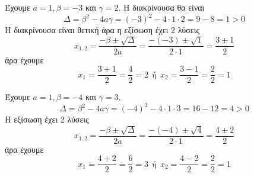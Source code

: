 \begin{alist}
\item Έχουμε $ a=1,\beta=-3 $ και $ \gamma=2 $. Η διακρίνουσα θα είναι
\[ \Delta=\beta^2-4a\gamma=(-3)^2-4\cdot 1\cdot 2=9-8=1>0 \]
Η διακρίνουσα είναι θετική άρα η εξίσωση έχει 2 λύσεις
\[ x_{1,2}=\frac{-\beta\pm\sqrt{\Delta}}{2a}=\frac{-(-3)\pm\sqrt{1}}{2\cdot 1}=\frac{3\pm 1}{2} \]
άρα έχουμε
\[ x_1=\frac{3+1}{2}=\frac{4}{2}=2\ \ \text{ή}\ \ x_2=\frac{3-1}{2}=\frac{2}{2}=1 \]
\item Έχουμε $ a=1,\beta=-4 $ και $ \gamma=3 $.
\[ \Delta=\beta^2-4a\gamma=(-4)^2-4\cdot 1\cdot 3=16-12=4>0 \]
Η εξίσωση έχει 2 λύσεις
\[ x_{1,2}=\frac{-\beta\pm\sqrt{\Delta}}{2a}=\frac{-(-4)\pm\sqrt{4}}{2\cdot 1}=\frac{4\pm 2}{2} \]
άρα έχουμε
\[ x_1=\frac{4+2}{2}=\frac{6}{2}=3\ \ \text{ή}\ \ x_2=\frac{4-2}{2}=\frac{2}{2}=1 \]
\end{alist}
